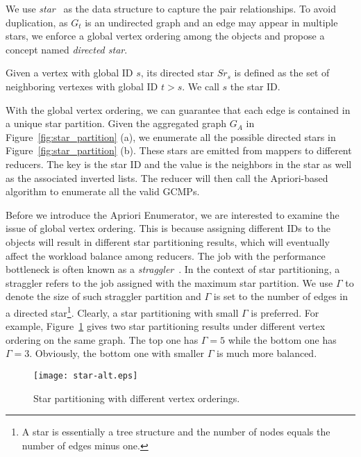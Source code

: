 We use \emph{star}~\cite{yoo2006joinless} as the data structure to capture the pair relationships. 
To avoid duplication, as $G_t$ is an undirected graph and an edge may appear in multiple stars, 
we enforce a global vertex ordering among the objects and propose a concept named \textit{directed star}.

\begin{definition}
Given a vertex with global ID $s$, its directed star $Sr_s$ is defined as the set of neighboring vertexes with global ID $t>s$. We call $s$ the star ID.
\end{definition}

With the global vertex ordering, we can guarantee that each edge is contained in a unique star partition. Given the aggregated graph $G_A$  in Figure~\ref{fig:star_partition} (a), we enumerate all the possible directed stars in Figure~\ref{fig:star_partition} (b). These stars are emitted from mappers to different reducers. The key is the star ID and the value is the neighbors in the star as well as the associated inverted lists. 
The reducer will then call the Apriori-based algorithm to enumerate all the valid GCMPs.


Before we introduce the Apriori Enumerator, we are interested to 
examine the issue of global vertex ordering.
This is because assigning different IDs to the objects will result in 
different star partitioning results, which will eventually affect the workload 
balance among reducers. The job with the performance bottleneck is often known as a  \emph{straggler}~\cite{kwon2012skewtune,coppa2015data}. In the context of star partitioning, a straggler refers to the job assigned with the maximum star partition. We use $\Gamma$ to denote the size of such straggler partition and $\Gamma$ is set to the number of edges in a directed star\footnote{A star is essentially a tree structure and the number of nodes equals the number of edges minus one.}. Clearly, a star partitioning with small $\Gamma$ is preferred. For example, Figure~\ref{fig:star-alt} gives two star partitioning results under 
different vertex ordering on the same graph. The top one has $\Gamma = 5$ while the bottom one has $\Gamma = 3$. Obviously, the bottom one with smaller $\Gamma$ is much more balanced.

\begin{figure}[h]
\centering
\texttt{[image: star-alt.eps]}
\vspace{-0.5em}
\caption{Star partitioning with different vertex orderings.}
\vspace{-0.5em}
\label{fig:star-alt}
\end{figure}

